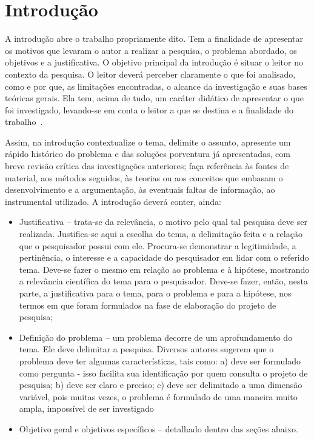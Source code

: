 \chapter{Introdução}\label{cap:introducao}

A introdução abre o trabalho propriamente dito. Tem a finalidade de apresentar os motivos que levaram o autor a realizar a pesquisa, o problema abordado, os objetivos e a justificativa. O objetivo principal da introdução é situar o leitor no contexto da pesquisa. O leitor deverá perceber claramente o que foi analisado, como e por que, as limitações encontradas, o alcance da investigação e suas bases teóricas gerais. Ela tem, acima de tudo, um caráter didático de apresentar o que foi investigado, levando-se em conta o leitor a que se destina e a finalidade do trabalho~\cite{ifsc:manual:comunicacao}. 

Assim, na introdução contextualize o tema, delimite o assunto, apresente um rápido histórico do problema e das soluções porventura já apresentadas, com breve revisão crítica das investigações anteriores; faça referência às fontes de material, aos métodos seguidos, às teorias ou aos conceitos que embasam o desenvolvimento e a argumentação, às eventuais faltas de informação, ao instrumental utilizado. A introdução deverá conter, ainda:

\begin{itemize}
   \item Justificativa -- trata-se da relevância, o motivo pelo qual tal pesquisa deve ser realizada. Justifica-se aqui a escolha do tema, a delimitação feita e a relação que o pesquisador possui com ele. Procura-se demonstrar a legitimidade, a pertinência, o interesse e a capacidade do pesquisador em lidar com o referido tema. Deve-se fazer o mesmo em relação ao problema e à hipótese, mostrando a relevância científica do tema para o pesquisador. Deve-se fazer, então, nesta parte, a justificativa para o tema, para o problema e para a hipótese, nos termos em que foram formulados na fase de elaboração do projeto de pesquisa;
   
   \item Definição do problema -- um problema decorre de um aprofundamento do tema. Ele deve delimitar a pesquisa. Diversos autores sugerem que o problema deve ter algumas características, tais como: a) deve ser formulado como pergunta - isso facilita sua identificação por quem consulta o projeto de pesquisa; b) deve ser claro e preciso; c) deve ser delimitado a uma dimensão variável, pois muitas vezes, o problema é formulado de uma maneira muito ampla, impossível de ser investigado 
   
   \item Objetivo geral e objetivos específicos -- detalhado dentro das seções abaixo.
\end{itemize}

